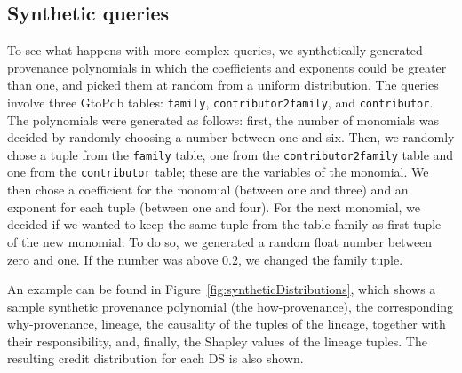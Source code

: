 \documentclass[preprint,12pt,sort&compress]{elsarticle}
\newcommand{\rone}[1]{\textcolor{reviewer1}{#1}}
\newcommand{\rtwo}[1]{\textcolor{reviewer2}{#1}}
\newcommand{\eat}[1]{}
\begin{document}
\subsection{Synthetic queries}
\label{sec:synth_queries}
\eat{
let us consider the case reported in Figure \ref{figure:comparison_on_synthetic_polynomials_2}. 
The figure reports a distribution of credit performed on the table \texttt{family} through the generation of 10K \emph{synthetic} polynomials. 
We randomly generated provenance polynomials that might be the how-provenance of randomly generated synthetic queries, using the three GtoPdb tables \texttt{family}, \texttt{contributor2family}, and \texttt{contributor}. 
An example of a synthetic polynomial that will be used throughout this subsection is:
}

To see what happens with more complex queries, 
\rone{we synthetically generated provenance polynomials in which the coefficients and exponents could be greater than one, and picked them at random from a uniform distribution.}
The queries involve three GtoPdb tables: \texttt{family}, \texttt{contributor2family}, and \texttt{contributor}. 
\rone{The polynomials were generated as follows: first, the number of monomials was decided by  randomly choosing a number between one and six.  Then, we randomly chose a tuple from the  \texttt{family} table, one from the \texttt{contributor2family} table and one from the \texttt{contributor} table; these are the variables of the monomial. We then chose a coefficient for the monomial (between one and three) and an exponent for each tuple (between one and four). For the next monomial, we decided if we wanted to keep the same tuple from the table family as first tuple of the new monomial. To do so, we generated a random float number between zero and one. If the number was above $0.2$, we changed the family tuple.}

An example can be found in Figure~\ref{fig:syntheticDistributions}, which shows a sample synthetic provenance polynomial (the how-provenance), the corresponding why-provenance, lineage, \rtwo{the causality of the tuples of the lineage, together with their responsibility, and, finally, the Shapley values of the lineage tuples}.  The resulting credit distribution for each DS is also shown.
\end{document}
